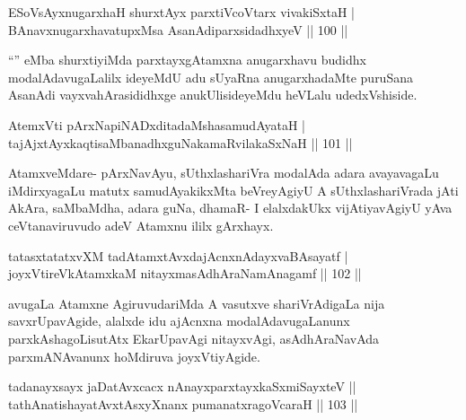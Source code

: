 \begin{shl}
ESoV\s sAyxnugarxhaH shurxtAyx parxtiVcoV\s tarx vivakiSxtaH | \\
BAnavxnugarxhavatupxMsa AsanAdiparxsidadhxyeV \hfill||  100 ||  
\end{shl}

\begin{artha}
``\stext'' eMba shurxtiyiMda parxtayxgAtamxna anugarxhavu budidhx modalAdavugaLalilx ideyeMdU adu sUyaRna anugarxhadaMte puruSana AsanAdi vayxvahArasididhxge anukUlisideyeMdu heVLalu udedxVshiside.
\end{artha}


\begin{shl}
AtemxVti pArxNapiNADxditadaMshasamudAyataH | \\
tajAjxtAyxkaqtisaMbanadhxguNakamaRvilakaSxNaH \hfill ||  101 ||  
\end{shl}

\begin{artha}
AtamxveMdare- pArxNavAyu, sUthxlashariVra modalAda adara avayavagaLu iMdirxyagaLu matutx samudAyakikxMta beVreyAgiyU A sUthxlashariVrada jAti AkAra, saMbaMdha, adara guNa, dhamaR- I elalxdakUkx vijAtiyavAgiyU yAva ceVtanaviruvudo adeV Atamxnu ililx gArxhayx.
\end{artha}


\begin{shl}
tatasxtatatxvXM tadAtamxtAvxdajAcnxnAdayxvaBAsayatf | \\
joyxVtireVkAtamxkaM nitayxmasAdhAraNamAnagamf \hfill||  102 ||  
\end{shl}

\begin{artha}
avugaLa Atamxne AgiruvudariMda A vasutxve shariVrAdigaLa nija savxrUpavAgide, alalxde idu ajAcnxna modalAdavugaLanunx parxkAshagoLisutAtx EkarUpavAgi nitayxvAgi, asAdhAraNavAda parxmANAvanunx hoMdiruva joyxVtiyAgide.
\end{artha}


\begin{shl}
tadanayxsayx jaDatAvxcacx nAnayxparxtayxkaSxmiSayxteV ||  \\
tathA\s natishayatAvxtAsxyXnanx pumanatxragoVcaraH \hfill||  103 ||  
\end{shl}

